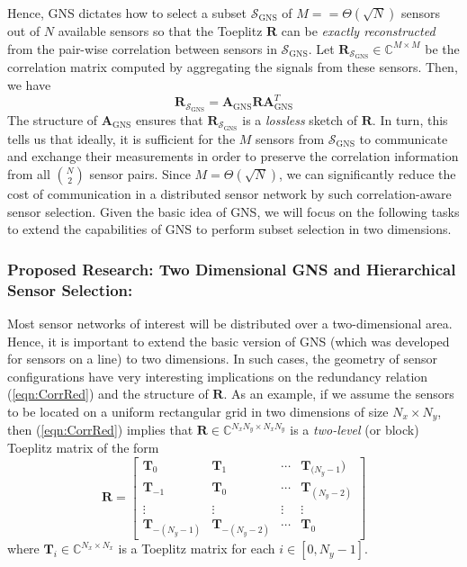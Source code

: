 {%
Hence, GNS dictates how to select a subset $\mathcal{S}_{\text{GNS}}$ of $M =  = \Theta(\sqrt{N})$ sensors out of $N$ available sensors so that the Toeplitz $\mathbf{R}$ can be {\em exactly reconstructed} from the pair-wise correlation between sensors in $\mathcal{S}_{\text{GNS}}$. Let $\mathbf{R}_{\mathcal{S}_{\text{GNS}}} \in \mathbb{C}^{M\times M}$ be the correlation matrix computed by aggregating the signals from these sensors. Then, we have 
\begin{equation}
\mathbf{R}_{\mathcal{S}_{\text{GNS}}} = \mathbf{A}_{\text{GNS}} \mathbf{R} \mathbf{A}^T_{\text{GNS}} 
\end{equation}
The structure of $\mathbf{A}_{\text{GNS}}$ ensures that $\mathbf{R}_{\mathcal{S}_{\text{GNS}}}$ is a {\em lossless} sketch of  $\mathbf{R}$. In turn, this tells us that ideally, it is sufficient for the $M$ sensors from $\mathcal{S}_{\text{GNS}}$ to communicate and exchange their measurements in order to  preserve the correlation information from all $N\choose 2$ sensor pairs. Since $M = \Theta(\sqrt{N})$, we can significantly reduce the cost of communication in a distributed sensor network by such correlation-aware sensor selection. Given the basic idea of GNS, we will focus on the following tasks to extend the capabilities of GNS to perform subset selection in two dimensions.
\subsubsection{ Proposed Research: Two Dimensional GNS and Hierarchical Sensor Selection:} 
Most sensor networks of interest will be distributed over a two-dimensional area. Hence, it is important to extend the basic version of GNS (which was developed for sensors on a line) to two dimensions. In such cases, the geometry of sensor configurations have very interesting implications on the redundancy relation (\ref{eqn:CorrRed}) and the structure of $\mathbf{R}$. As an example, if we assume the sensors to be located on a uniform rectangular grid in two dimensions of size $N_x\times N_y$, then (\ref{eqn:CorrRed}) implies that $\mathbf{R}\in \mathbb{C}^{N_xN_y \times N_xN_y}$ is a {\em two-level} (or block) Toeplitz matrix of the form 
\begin{equation}
\mathbf{R} = \left[\begin{array}{cccc} \mathbf{T}_0 & \mathbf{T}_1 & \cdots & \mathbf{T}_{(N_y-1}) \\
\mathbf{T}_{-1} & \mathbf{T}_0 & \cdots & \mathbf{T}_{(N_y-2)}\\
\vdots & \vdots & \vdots & \vdots \\
\mathbf{T}_{-(N_y-1)} & \mathbf{T}_{-(N_y-2)} & \cdots & \mathbf{T}_0 \end{array}\right]
\label{eqn:2LevelToep} \end{equation}
where $\mathbf{T}_i\in \mathbb{C}^{N_x\times N_x}$ is a Toeplitz matrix for each $i\in [0,N_y-1]$. 

}
